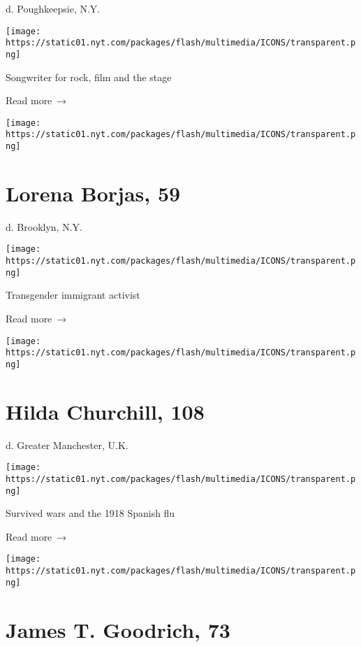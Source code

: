 d. Poughkeepsie, N.Y.

\texttt{[image: https://static01.nyt.com/packages/flash/multimedia/ICONS/transparent.png]}

Songwriter for rock, film and the stage

 Read more~→

\href{https://www.nytimes.com/2020/04/01/obituaries/lorena-borjas-dead-coronavirus.html}{}

\texttt{[image: https://static01.nyt.com/packages/flash/multimedia/ICONS/transparent.png]}

\hypertarget{lorena-borjas-59}{%
\section{Lorena Borjas, 59}\label{lorena-borjas-59}}

d. Brooklyn, N.Y.

\texttt{[image: https://static01.nyt.com/packages/flash/multimedia/ICONS/transparent.png]}

Transgender immigrant activist

 Read more~→

\href{https://www.nytimes.com/2020/04/01/obituaries/hilda-churchill-dead-coronavirus.html}{}

\texttt{[image: https://static01.nyt.com/packages/flash/multimedia/ICONS/transparent.png]}

\hypertarget{hilda-churchill-108}{%
\section{Hilda Churchill, 108}\label{hilda-churchill-108}}

d. Greater Manchester, U.K.

\texttt{[image: https://static01.nyt.com/packages/flash/multimedia/ICONS/transparent.png]}

Survived wars and the 1918 Spanish flu

 Read more~→

\href{https://www.nytimes.com/2020/04/01/obituaries/dr-james-t-goodrich-dead-coronavirus.html}{}

\texttt{[image: https://static01.nyt.com/packages/flash/multimedia/ICONS/transparent.png]}

\hypertarget{james-t-goodrich-73}{%
\section{James T. Goodrich, 73}\label{james-t-goodrich-73}}

